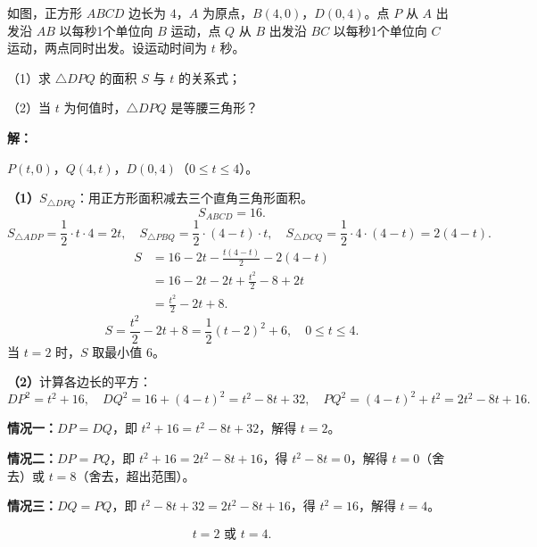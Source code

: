 \documentclass[12pt, a4paper]{ctexart}
\begin{document}
\begin{examplebox}[【例3】正方形中双动点]
如图，正方形 $ABCD$ 边长为 $4$，$A$ 为原点，$B(4,0)$，$D(0,4)$。点 $P$ 从 $A$ 出发沿 $AB$ 以每秒1个单位向 $B$ 运动，点 $Q$ 从 $B$ 出发沿 $BC$ 以每秒1个单位向 $C$ 运动，两点同时出发。设运动时间为 $t$ 秒。

（1）求 $\triangle DPQ$ 的面积 $S$ 与 $t$ 的关系式；

（2）当 $t$ 为何值时，$\triangle DPQ$ 是等腰三角形？

\begin{center}
\end{center}

\textbf{解：}

$P(t,0)$，$Q(4,t)$，$D(0,4)$（$0\le t\le 4$）。

\textbf{（1）}$S_{\triangle DPQ}$：用正方形面积减去三个直角三角形面积。
\[S_{ABCD}=16.\]
\[S_{\triangle ADP}=\frac{1}{2}\cdot t\cdot 4=2t,\quad
S_{\triangle PBQ}=\frac{1}{2}\cdot(4-t)\cdot t,\quad
S_{\triangle DCQ}=\frac{1}{2}\cdot 4\cdot(4-t)=2(4-t).\]
\begin{align*}
S &= 16-2t-\frac{t(4-t)}{2}-2(4-t)\\
  &= 16-2t-2t+\frac{t^2}{2}-8+2t\\
  &= \frac{t^2}{2}-2t+8.
\end{align*}
\[\boxed{S=\frac{t^2}{2}-2t+8=\frac{1}{2}(t-2)^2+6,\quad 0\le t\le 4.}\]
当 $t=2$ 时，$S$ 取最小值 $6$。

\textbf{（2）}计算各边长的平方：
\[DP^2=t^2+16,\quad DQ^2=16+(4-t)^2=t^2-8t+32,\quad PQ^2=(4-t)^2+t^2=2t^2-8t+16.\]

\textbf{情况一：}$DP=DQ$，即 $t^2+16=t^2-8t+32$，解得 $t=2$。

\textbf{情况二：}$DP=PQ$，即 $t^2+16=2t^2-8t+16$，得 $t^2-8t=0$，解得 $t=0$（舍去）或 $t=8$（舍去，超出范围）。

\textbf{情况三：}$DQ=PQ$，即 $t^2-8t+32=2t^2-8t+16$，得 $t^2=16$，解得 $t=4$。

\[\boxed{t=2 \text{ 或 } t=4.}\]
\end{examplebox}
\end{document}
